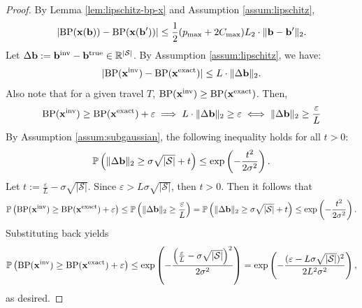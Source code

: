 \documentclass[10pt,a4paper]{amsart}
\begin{document}
\begin{proof}
By Lemma \ref{lem:lipschitz-bp-x} and Assumption \ref{assum:lipschitz}, 
\[
|\text{BP}({\bf x}({\bf b})) - \text{BP}({\bf x}({\bf b}'))| \leq \frac{1}{2}(p_{\max} + 2C_{\max}) L_2 \cdot \|{\bf b} - {\bf b}'\|_2.
\]
Let \( \Delta {\bf b} := {\bf b}^{\text{inv}} - {\bf b}^{\text{true}} \in \mathbb{R}^{|\mathcal{S}|} \).
By Assumption \ref{assum:lipschitz}, we have:
\[
| \text{BP}({\bf x}^{\text{inv}}) - \text{BP}({\bf x}^{\text{exact}}) | \leq L \cdot \| \Delta {\bf b} \|_2.
\]
Also note that for a given travel $T$, \(\text{BP}({\bf x}^{\text{inv}}) \geq \text{BP}({\bf x}^{\text{exact}}) \). Then, 
\[
\text{BP}({\bf x}^{\text{inv}}) \geq \text{BP}({\bf x}^{\text{exact}}) + \varepsilon
\implies
L \cdot \| \Delta {\bf b} \|_2 \geq \varepsilon 
\iff  \| \Delta {\bf b} \|_2 \geq  \frac{\varepsilon }{L}
\]
By Assumption \ref{assum:subgaussian}, the following inequality holds for all $t >0$:
\[
\mathbb{P}\left( \| \Delta {\bf b} \|_2 \geq \sigma \sqrt{|\mathcal{S}|} + t \right)
\leq \exp\left( -\frac{t^2}{2\sigma^2} \right). 
\]
Let \( t := \frac{\varepsilon}{L} - \sigma \sqrt{|\mathcal{S}|} \). Since \( \varepsilon > L \sigma \sqrt{|\mathcal{S}|} \), then \( t > 0 \). Then it follows that 
\[
\mathbb{P}\left( \text{BP}({\bf x}^{\text{inv}}) \geq \text{BP}({\bf x}^{\text{exact}}) + \varepsilon \right)
\leq \mathbb{P}\left( \| \Delta {\bf b} \|_2 \geq \frac{\varepsilon}{L} \right)
= \mathbb{P}\left( \| \Delta {\bf b} \|_2 \geq \sigma \sqrt{|\mathcal{S}|} + t \right)
\leq \exp\left( -\frac{t^2}{2\sigma^2} \right).
\]
Substituting back yields
\[
\mathbb{P}\left( \text{BP}({\bf x}^{\text{inv}}) \geq \text{BP}({\bf x}^{\text{exact}}) + \varepsilon \right)
\leq
\exp\left( -\frac{\left( \frac{\varepsilon}{L} - \sigma \sqrt{|\mathcal{S}|} \right)^2}{2 \sigma^2} \right)
= \exp\left( -\frac{(\varepsilon - L \sigma \sqrt{|\mathcal{S}|})^2}{2 L^2 \sigma^2} \right),
\]
as desired.
\end{proof}
\end{document}
